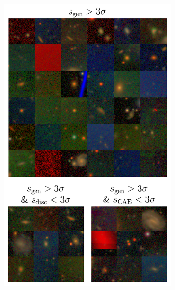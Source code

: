 \begin{figure} 
\begin{subfigure}{0.33\textwidth}
  \centering
  \includegraphics[width=0.95\linewidth]{score_effect_gen_ae.png}
  \caption{}
  \label{fig:score_effect_gen}
\end{subfigure}
\begin{subfigure}{0.33\textwidth}
  \centering

\end{subfigure}
\end{figure}
